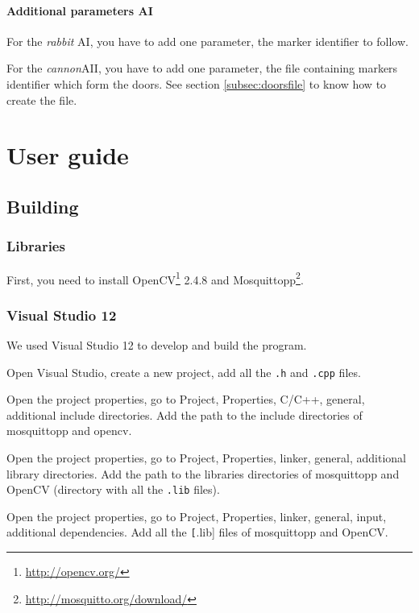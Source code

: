 \documentclass[a4paper,11pt]{report}
\begin{document}
\subsubsection{Additional parameters AI}

For the \emph{rabbit} AI, you have to add one parameter, the marker identifier
to follow.

For the \emph{cannon}AII, you have to add one parameter, the file containing
markers identifier which form the doors. See section \ref{subsec:doorsfile} to
know how to create the file.

\chapter{User guide}

\section{Building}
\label{sec:build}

\subsection{Libraries}

First, you need to install OpenCV\footnote{\url{http://opencv.org/}} 2.4.8 and
Mosquittopp\footnote{\url{http://mosquitto.org/download/}}.

\subsection{Visual Studio 12}

We used Visual Studio 12 to develop and build the program.

Open Visual Studio, create a new project, add all the \texttt{.h} and
\texttt{.cpp} files.

Open the project properties, go to Project, Properties, C/C++, general,
additional include directories. Add the path to the include directories of
mosquittopp and opencv.

Open the project properties, go to Project, Properties, linker, general,
additional library directories. Add the path to the libraries directories of
mosquittopp and OpenCV (directory with all the \texttt{.lib} files).

Open the project properties, go to Project, Properties, linker, general, input,
additional dependencies. Add all the \texttt[.lib] files of mosquittopp and
OpenCV.
\end{document}
